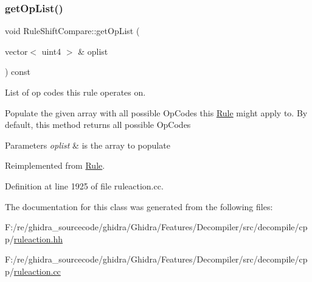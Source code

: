 \subsubsection{\texorpdfstring{getOpList()}{getOpList()}}
{\footnotesize\ttfamily void Rule\+Shift\+Compare\+::get\+Op\+List (\begin{DoxyParamCaption}\item[{vector$<$ uint4 $>$ \&}]{oplist }\end{DoxyParamCaption}) const\hspace{0.3cm}{\ttfamily [virtual]}}



List of op codes this rule operates on. 

Populate the given array with all possible Op\+Codes this \mbox{\hyperlink{class_rule}{Rule}} might apply to. By default, this method returns all possible Op\+Codes 
\begin{DoxyParams}{Parameters}
{\em oplist} & is the array to populate \\
\hline
\end{DoxyParams}


Reimplemented from \mbox{\hyperlink{class_rule_a4023bfc7825de0ab866790551856d10e}{Rule}}.



Definition at line 1925 of file ruleaction.\+cc.



The documentation for this class was generated from the following files\+:\begin{DoxyCompactItemize}
\item 
F\+:/re/ghidra\+\_\+sourcecode/ghidra/\+Ghidra/\+Features/\+Decompiler/src/decompile/cpp/\mbox{\hyperlink{ruleaction_8hh}{ruleaction.\+hh}}\item 
F\+:/re/ghidra\+\_\+sourcecode/ghidra/\+Ghidra/\+Features/\+Decompiler/src/decompile/cpp/\mbox{\hyperlink{ruleaction_8cc}{ruleaction.\+cc}}\end{DoxyCompactItemize}
